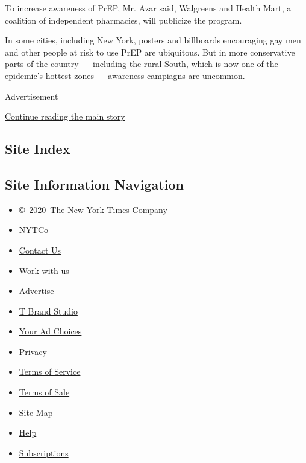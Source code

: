 To increase awareness of PrEP, Mr. Azar said, Walgreens and Health Mart,
a coalition of independent pharmacies, will publicize the program.

In some cities, including New York, posters and billboards encouraging
gay men and other people at risk to use PrEP are ubiquitous. But in more
conservative parts of the country --- including the rural South, which
is now one of the epidemic's hottest zones --- awareness campiagns are
uncommon.

Advertisement

\protect\hyperlink{after-bottom}{Continue reading the main story}

\hypertarget{site-index}{%
\subsection{Site Index}\label{site-index}}

\hypertarget{site-information-navigation}{%
\subsection{Site Information
Navigation}\label{site-information-navigation}}

\begin{itemize}
\tightlist
\item
  \href{https://help.nytimes3xbfgragh.onion/hc/en-us/articles/115014792127-Copyright-notice}{©~2020~The
  New York Times Company}
\end{itemize}

\begin{itemize}
\tightlist
\item
  \href{https://www.nytco.com/}{NYTCo}
\item
  \href{https://help.nytimes3xbfgragh.onion/hc/en-us/articles/115015385887-Contact-Us}{Contact
  Us}
\item
  \href{https://www.nytco.com/careers/}{Work with us}
\item
  \href{https://nytmediakit.com/}{Advertise}
\item
  \href{http://www.tbrandstudio.com/}{T Brand Studio}
\item
  \href{https://www.nytimes3xbfgragh.onion/privacy/cookie-policy\#how-do-i-manage-trackers}{Your
  Ad Choices}
\item
  \href{https://www.nytimes3xbfgragh.onion/privacy}{Privacy}
\item
  \href{https://help.nytimes3xbfgragh.onion/hc/en-us/articles/115014893428-Terms-of-service}{Terms
  of Service}
\item
  \href{https://help.nytimes3xbfgragh.onion/hc/en-us/articles/115014893968-Terms-of-sale}{Terms
  of Sale}
\item
  \href{https://spiderbites.nytimes3xbfgragh.onion}{Site Map}
\item
  \href{https://help.nytimes3xbfgragh.onion/hc/en-us}{Help}
\item
  \href{https://www.nytimes3xbfgragh.onion/subscription?campaignId=37WXW}{Subscriptions}
\end{itemize}
